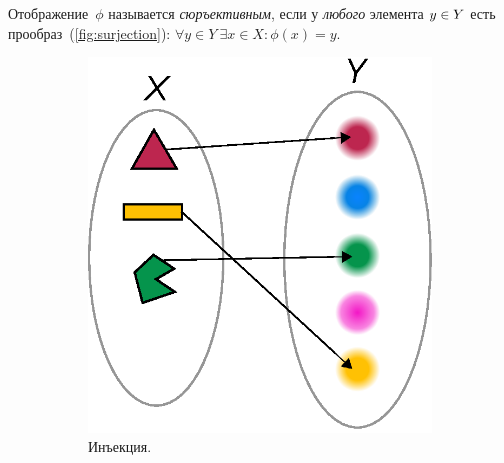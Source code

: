 \documentclass[a4paper,12pt]{article}
\begin{document}
  \begin{definition}
    Отображение~$\phi$ называется \emph{сюръективным}, если у \emph{любого} элемента $y \hm\in Y$ есть прообраз~(\ref{fig:surjection}):
    $
      \forall y \in Y\ \exists x \in X\colon \phi(x) = y
    $.
  \end{definition}
  
  \begin{figure}[ht]
    \centering
    
    \begin{subfigure}[b]{0.3\textwidth}
      \centering
    
      \includegraphics[width=\columnwidth]{injection}
    
      \caption{Инъекция.}
      \label{fig:injection}
    \end{subfigure}
    \hspace{2em}
    \begin{subfigure}[b]{0.3\textwidth}
      

\end{subfigure}
\end{figure}
\end{document}
